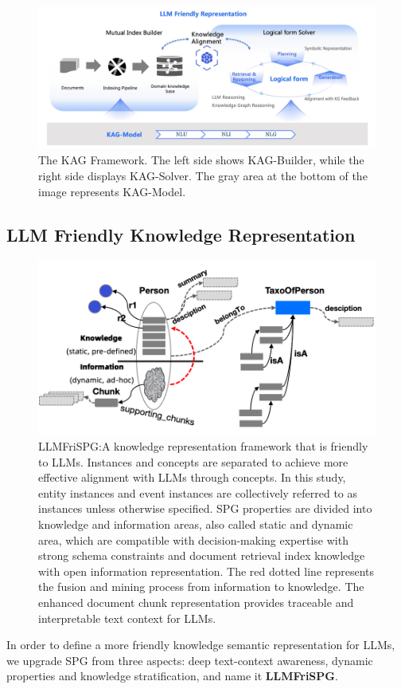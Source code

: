\documentclass{article}
\begin{document}
\begin{figure}[htbp]
    \centering
    \includegraphics[width=0.9\linewidth]{figures/kag-frame.jpg}
    \caption{The KAG Framework. The left side shows KAG-Builder, while the right side displays KAG-Solver. The gray area at the bottom of the image represents KAG-Model. }
    \label{fig:kag_framework}
\end{figure}



\subsection{LLM Friendly Knowledge Representation}
\begin{figure}[htbp]
    \centering
    \includegraphics[width=0.8\linewidth]{figures/llmspg.png}
    \caption{LLMFriSPG:A knowledge representation framework that is friendly to LLMs. Instances and concepts are separated to achieve more effective alignment with LLMs through concepts. In this study, entity instances and event instances are collectively referred to as instances unless otherwise specified. SPG properties are divided into knowledge and information areas, also called static and dynamic area, which are compatible with decision-making expertise with strong schema constraints and document retrieval index knowledge with open information representation. The red dotted line represents the fusion and mining process from information to knowledge. The enhanced document chunk representation provides traceable and interpretable text context for LLMs.}
    \label{fig:llmspg}
\end{figure}
In order to define a more friendly knowledge semantic representation for LLMs, we upgrade SPG from three aspects: deep text-context awareness, dynamic properties and knowledge stratification, and name it \textbf{LLMFriSPG}.
\end{document}
